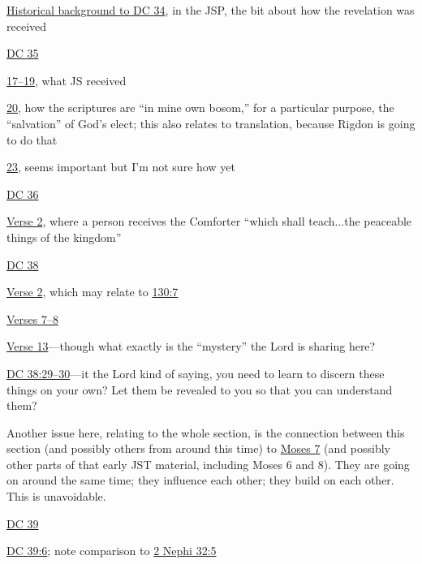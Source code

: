\begin{compactdesc}
\begin{compactitem}
				\end{compactitem}
			\item \hyperref[DC34-HB]{Historical background to DC 34}, in the JSP, the bit about how the revelation was received
			\item \hyperref[DC35]{DC 35}
				\begin{compactitem}
					\item \hyperref[DC35-17]{17--19}, what JS received
					\item \hyperref[DC35-20]{20}, how the scriptures are ``in mine own bosom,'' for a particular purpose, the ``salvation'' of God's elect; this also relates to translation, because Rigdon is going to do that
					\item \hyperref[DC35-23]{23}, seems important but I'm not sure how yet
				\end{compactitem}
			\item \hyperref[DC36]{DC 36}
				\begin{compactitem}
					\item \hyperref[DC36-2]{Verse 2}, where a person receives the Comforter ``which shall teach...the peaceable things of the kingdom''
				\end{compactitem}
			\item \hyperref[DC38]{DC 38}
				\begin{compactitem}
					\item \hyperref[DC38-2]{Verse 2}, which may relate to \hyperref[DC130-7]{130:7}
					\item \hyperref[DC38-7]{Verses 7--8}
					\item \hyperref[DC38-13]{Verse 13}---though what exactly is the ``mystery'' the Lord is sharing here?
					\item \hyperref[DC38-29]{DC 38:29--30}---it the Lord kind of saying, you need to learn to discern these things on your own? Let them be revealed to you so that you can understand them?
					\item Another issue here, relating to the whole section, is the connection between this section (and possibly others from around this time) to \hyperref[MOSES-7]{Moses 7} (and possibly other parts of that early JST material, including Moses 6 and 8). They are going on around the same time; they influence each other; they build on each other. This is unavoidable.
				\end{compactitem}
			\item \hyperref[DC39]{DC 39}
				\begin{compactitem}
					\item \hyperref[DC39-6]{DC 39:6}; note comparison to \hyperref[2NEPHI-32-5]{2 Nephi 32:5}

\end{compactitem}
\end{compactdesc}
